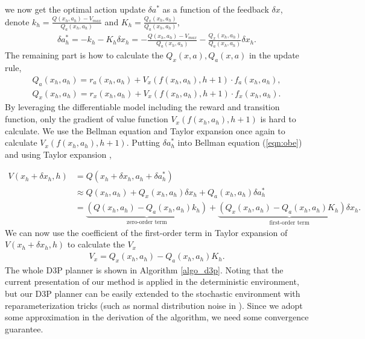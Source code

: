 \documentclass{article}
\newcommand{\vmax}{V_{max}}
\newcommand{\yue}[1]{ {#1}}
\begin{document}
we now get the optimal action update $\delta a^*$ as a function of the feedback $\delta x$, denote $k_h =\frac{Q(x_h,a_h)- \vmax}{Q_a (x_h,a_h)} $ and $K_h = \frac{Q_x(x_h,a_h)}{Q_a(x_h,a_h)}$,
\begin{align}
\label{eqa_term}
    \delta a^*_h 
    = -k_h - K_h \delta x_h =-\frac{Q(x_h,a_h)- \vmax}{Q_a (x_h,a_h)} - \frac{Q_x(x_h,a_h)}{Q_a(x_h,a_h)}\delta x_h .
\end{align} 
The remaining part is how to calculate the $Q_x(x,a), Q_a(x,a)$ in the update rule,  
\begin{align}
\label{eqa_dqda}
    Q_a(x_h,a_h) = r_a(x_h,a_h) + V_x(f(x_h,a_h), h+1) \cdot f_a(x_h, a_h), \\
    \label{eqa_dqdx}
    Q_x(x_h,a_h) = r_x(x_h,a_h) + V_x(f(x_h,a_h), h+1) \cdot f_x(x_h, a_h).
\end{align}
By leveraging the differentiable model including the reward and transition function, only the gradient of value function $V_x(f(x_h,a_h), h+1)$ is hard to calculate.
We use the Bellman equation and Taylor expansion once again to calculate $V_x(f(x_h, a_h),h+1)$. 
 Putting $\delta a^*_h$ into Bellman equation (\ref{eqn:obe}) and using Taylor expansion , 

\begin{align}
   V(x_h +\delta x_h , h)   &= Q(x_h + \delta x_h , a_h +\delta a^*_h) \\
                            &\approx Q(x_h, a_h) +  Q_x(x_h, a_h)\delta x_h + Q_a(x_h, a_h) \delta a_h^* \\
                            &=  \underbrace{(Q(x_h, a_h) - Q_a(x_h,a_h)k_h)}_{\text{zero-order term}} + \underbrace{(Q_x(x_h, a_h) - Q_a(x_h, a_h)K_h)\delta  x_h.}_{\text{first-order term}}  
\end{align}
We can now use the coefficient of the first-order term in  Taylor expansion of $V(x_h +\delta x_h , h)$ to calculate the $V_x$
\begin{align}\label{eq:v_x}
    V_x = Q_x(x_h, a_h) - Q_a(x_h, a_h)K_h .
\end{align}
The whole D3P planner is shown in Algorithm \ref{algo_d3p}. \yue{Noting that the current presentation of our method is applied in the deterministic environment, but our D3P planner can be easily extended to the stochastic environment with reparameterization tricks (such as normal distribution noise in ). }
Since we adopt some approximation in the derivation of the algorithm, we need some convergence guarantee. 
\end{document}
